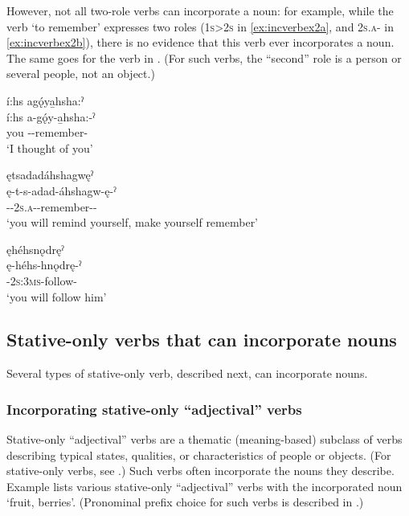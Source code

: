 However, not all two-role verbs can incorporate a noun: for example, while the verb  ‘to remember’  expresses two roles (\textsc{1s>2s} in \ref{ex:incverbex2a}, and \textsc{2s.a}-{\semireflexive} in \ref{ex:incverbex2b}), there is no evidence that this verb ever incorporates a noun. The same goes for the verb in . (For such verbs, the “second” role is a person or several people, not an object.)

\ea\label{ex:incverbex2}
\ea í:hs agǫ́ya̱hsha:ˀ\\\label{ex:incverbex2a}
\gll í:hs a-gǫ́y-a̱hsha:-ˀ\\
 you {\factual}--remember-{\punctual}\\
\glt `I thought of you'

\ex ętsadadáhshagwęˀ\\\label{ex:incverbex2b}
\gll ę-t-s-adad-áhshagw-ę-ˀ\\
 \fut-{\cislocative}-\textsc{2s.a}-{}-remember-{\benefactive}-{\punctual}\\
\glt `you will remind yourself, make yourself remember'
\z
\z

\ea\label{ex:incverbex3} ęhéhsnǫdręˀ\\
\gll ę-héhs-hnǫdrę-ˀ\\
\fut-\textsc{2s:3ms}-follow-{\punctual}\\
\glt ‘you will follow him’
\z



\subsection{Stative-only verbs that can incorporate nouns} \label{ch:Stative-only verbs that can incorporate nouns}
Several types of stative-only verb, described next, can incorporate nouns.

\subsubsection*{Incorporating stative-only “adjectival” verbs} \label{ch:Incorporating adjectival (stative-only) verbs}
Stative-only “adjectival” verbs are a thematic (meaning-based) subclass of verbs describing typical states, qualities, or characteristics of people or objects. (For stative-only verbs, see .) Such verbs often incorporate the nouns they describe. Example  lists various stative-only “adjectival” verbs with the incorporated noun  ‘fruit, berries’. (Pronominal prefix choice for such verbs is described in .)

